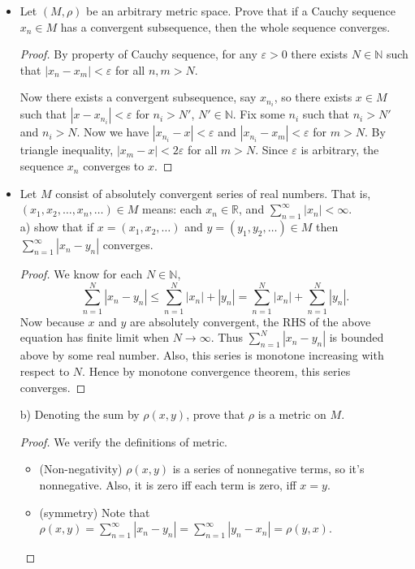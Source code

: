 
\begin{itemize}
	\item Let $(M, \rho)$ be an arbitrary metric space. Prove that if a Cauchy sequence $x_n \in M$ has a convergent subsequence, then the whole sequence converges.
\begin{proof}
	By property of Cauchy sequence, for any $\varepsilon>0$ there exists  $N \in \mathbb{N}$ such that $\left| x_n - x_m \right| <\varepsilon$ for all $n, m > N$. 

	Now there exists a convergent subsequence, say $x_{n_i}$, so there exists $x \in M$ such that $\left| x - x_{n_i} \right| <\varepsilon$ for $n_i > N'$, $N' \in \mathbb{N}$. Fix some $n_i$ such that $n_i > N'$ and $n_i > N$. Now we have $\left| x_{n_i} - x \right| <\varepsilon$ and $\left| x_{n_i} - x_m \right| <\varepsilon$ for $m > N$. By triangle inequality, $\left| x_m - x \right| < 2 \varepsilon$ for all $m > N$. Since $\varepsilon$ is arbitrary, the sequence $x_n$ converges to $x$.
\end{proof}
\item Let $M$ consist of absolutely convergent series of real numbers. That is, $(x_1, x_2, \ldots, x_n, \ldots) \in M$ means: each $x_n \in \mathbb{R}$, and $\sum_{n=1}^{\infty} \left| x_n \right| <\infty $.\\
	a) show that if $x = (x_1, x_2, \ldots)$ and $y = (y_1, y_2, \ldots) \in M$ then $\sum_{n=1}^{\infty} \left| x_n - y_n \right| $ converges.
	\begin{proof}
		We know for each $N \in \mathbb{N}$,
		\[
			\sum_{n=1}^{N} \left| x_n - y_n \right| \le \sum_{n=1}^{N} |x_n| + |y_n| = \sum_{n=1}^{N} |x_n| + \sum_{n=1}^{N} |y_n| 
		.\] 
		Now because $x$ and $y$ are absolutely convergent, the RHS of the above equation has finite limit when $N \to \infty $. Thus $\sum_{n=1}^{N} \left| x_n - y_n \right|$ is bounded above by some real number. Also, this series is monotone increasing with respect to $N$. Hence by monotone convergence theorem, this series converges.
	\end{proof}
	b) Denoting the sum by $\rho(x,y)$, prove that $\rho$ is a metric on $M$.
	\begin{proof}
		We verify the definitions of metric.
		\begin{itemize}
			\item (Non-negativity) $\rho(x,y)$ is a series of nonnegative terms, so it's nonnegative. Also, it is zero iff each term is zero, iff $x = y$.
			\item (symmetry) Note that $\rho(x,y) = \sum_{n=1}^{\infty} \left| x_n - y_n \right|  = \sum_{n=1}^{\infty} \left| y_n - x_n \right|  = \rho(y,x)$.

\end{itemize}
\end{proof}
\end{itemize}
